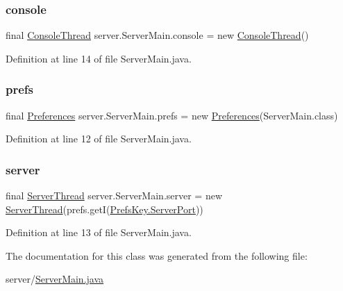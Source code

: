 \subsubsection{\texorpdfstring{console}{console}}
{\footnotesize\ttfamily final \hyperlink{classserver_1_1other_1_1_console_thread}{Console\+Thread} server.\+Server\+Main.\+console = new \hyperlink{classserver_1_1other_1_1_console_thread}{Console\+Thread}()\hspace{0.3cm}{\ttfamily [static]}}



Definition at line 14 of file Server\+Main.\+java.

\hypertarget{classserver_1_1_server_main_ad846c85619320e3c5503175b3156c6ce}{}\label{classserver_1_1_server_main_ad846c85619320e3c5503175b3156c6ce} 
\subsubsection{\texorpdfstring{prefs}{prefs}}
{\footnotesize\ttfamily final \hyperlink{classsharedlib_1_1utils_1_1_preferences}{Preferences} server.\+Server\+Main.\+prefs = new \hyperlink{classsharedlib_1_1utils_1_1_preferences}{Preferences}(Server\+Main.\+class)\hspace{0.3cm}{\ttfamily [static]}}



Definition at line 12 of file Server\+Main.\+java.

\hypertarget{classserver_1_1_server_main_ab0941f19c36879a7b6b36f9d3c163909}{}\label{classserver_1_1_server_main_ab0941f19c36879a7b6b36f9d3c163909} 
\subsubsection{\texorpdfstring{server}{server}}
{\footnotesize\ttfamily final \hyperlink{classserver_1_1conn_1_1_server_thread}{Server\+Thread} server.\+Server\+Main.\+server = new \hyperlink{classserver_1_1conn_1_1_server_thread}{Server\+Thread}(prefs.\+getI(\hyperlink{enumserver_1_1other_1_1_prefs_key_a97c1897d83b59cf6735643e3b50d549b}{Prefs\+Key.\+Server\+Port}))\hspace{0.3cm}{\ttfamily [static]}}



Definition at line 13 of file Server\+Main.\+java.



The documentation for this class was generated from the following file\+:\begin{DoxyCompactItemize}
\item 
server/\hyperlink{_server_main_8java}{Server\+Main.\+java}\end{DoxyCompactItemize}
